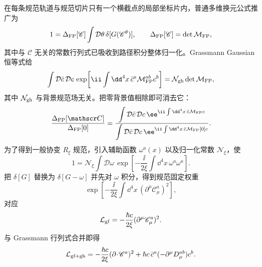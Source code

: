 \begin{derivation}
在每条规范轨道与规范切片只有一个横截点的局部坐标片内，普通多维换元公式推广为
\begin{equation*}
 1=\Delta_{\rm FP}[\mathscr C]
 \int\mathcal D\theta\,\delta[G(\mathscr C^\theta)],
 \qquad
 \Delta_{\rm FP}[\mathscr C]=\det\mathcal M_{\rm FP},
\end{equation*}
其中与 $\mathscr C$ 无关的常数行列式已吸收到路径积分整体归一化。Grassmann Gaussian 恒等式给
\begin{equation*}
 \int\mathcal D\bar c\,\mathcal Dc\,
 \exp\!\left[
 \ii\int\dd^4x\,\bar c^a\mathcal M_{\rm FP}^{ab}c^b
 \right]
 =\mathcal N_{\rm gh}\det\mathcal M_{\rm FP},
\end{equation*}
其中 $\mathcal N_{\rm gh}$ 与背景规范场无关。把零背景值相除即可消去它：
\begin{equation*}
 \frac{\Delta_{\rm FP}[\mathscr C]}{\Delta_{\rm FP}[0]}
 =
 \frac{\displaystyle\int\mathcal D\bar c\,\mathcal Dc\,
 \ee^{\ii\int\dd^4x\,\bar c\mathcal M_{\rm FP}c}}
 {\displaystyle\int\mathcal D\bar c\,\mathcal Dc\,
 \ee^{\ii\int\dd^4x\,\bar c\mathcal M_{\rm FP}[0]c}}.
\end{equation*}
为了得到一般协变 $R_\xi$ 规范，引入辅助函数 $\omega^a(x)$ 以及归一化常数 $\mathcal N_\xi$，使
\begin{equation*}
 1=\mathcal N_\xi
 \int\mathcal D\omega\,
 \exp\!\left[-\frac{\ii}{2\xi}
 \int\dd^4x\,\omega^a\omega^a\right].
\end{equation*}
把 $\delta[G]$ 替换为 $\delta[G-\omega]$ 并先对 $\omega$ 积分，得到规范固定权重
\begin{equation*}
 \exp\!\left[-\frac{\ii}{2\xi}\int\dd^4x\,
 (\partial^\mu\mathscr C_\mu^a)^2\right],
\end{equation*}
对应
\begin{equation*}
 \mathcal L_{\rm gf}
 =-\frac{\hbar c}{2\xi}(\partial^\mu\mathscr C_\mu^a)^2.
\end{equation*}
与 Grassmann 行列式合并即得
\begin{equation*}
 \mathcal L_{\rm gf+gh}
 =-\frac{\hbar c}{2\xi}(\partial\!\cdot\!\mathscr C^a)^2
 +\hbar c\,\bar c^a(-\partial^\mu D_\mu^{ab})c^b.
\end{equation*}


\end{derivation}
